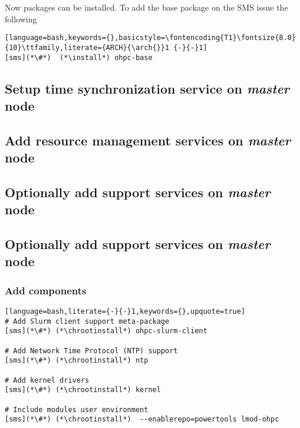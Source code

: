 \documentclass[letterpaper]{article}
\newcommand{\arch}{x86\_64}
\newcommand{\install}{dnf -y install}
\newcommand{\chrootinstall}{nodeshell compute dnf -y  install}
\begin{document}
Now \OHPC{} packages can be installed. To add the base package on the SMS
issue the following
\begin{lstlisting}[language=bash,keywords={},basicstyle=\fontencoding{T1}\fontsize{8.0}{10}\ttfamily,literate={ARCH}{\arch{}}1 {-}{-}1]
[sms](*\#*)  (*\install*) ohpc-base
\end{lstlisting}



\subsection{Setup time synchronization service on {\em master} node} \label{sec:add_ntp}


%


\subsection{Add resource management services on {\em master} node} \label{sec:add_rm}


\subsection{Optionally add \InfiniBand{} support services on {\em master} node} \label{sec:add_ofed}


\subsection{Optionally add \OmniPath{} support services on {\em master} node} \label{sec:add_opa}


\vspace*{0.2cm}
\subsubsection{Add \OHPC{} components} \label{sec:add_components}


\begin{lstlisting}[language=bash,literate={-}{-}1,keywords={},upquote=true]
# Add Slurm client support meta-package
[sms](*\#*) (*\chrootinstall*) ohpc-slurm-client

# Add Network Time Protocol (NTP) support
[sms](*\#*) (*\chrootinstall*) ntp

# Add kernel drivers
[sms](*\#*) (*\chrootinstall*) kernel

# Include modules user environment
[sms](*\#*) (*\chrootinstall*)  --enablerepo=powertools lmod-ohpc
\end{lstlisting}
\end{document}
